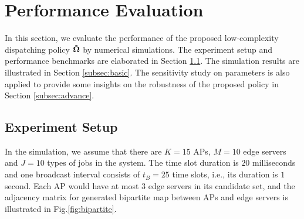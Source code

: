 \section{Performance Evaluation}
\label{sec:evaluation}
In this section, we evaluate the performance of the proposed low-complexity dispatching policy $\tilde{\boldsymbol{\Omega}}$ by numerical simulations.
The experiment setup and performance benchmarks are elaborated in Section \ref{subsec:setup}.
The simulation results are illustrated in Section \ref{subsec:basic}.
The sensitivity study on parameters is also applied to provide some insights on the robustness of the proposed policy in Section \ref{subsec:advance}.

\subsection{Experiment Setup}
\label{subsec:setup}
{
    In the simulation, we assume that there are $K=15$ APs, $M=10$ edge servers and $J=10$ types of jobs in the system.
    The time slot duration is $20$ milliseconds and one broadcast interval consists of $t_{B}=25$ time slots, i.e., its duration is $1$ second.
    Each AP would have at most $3$ edge servers in its candidate set, and the adjacency matrix for generated bipartite map between APs and edge servers is illustrated in Fig.\ref{fig:bipartite}.
}

